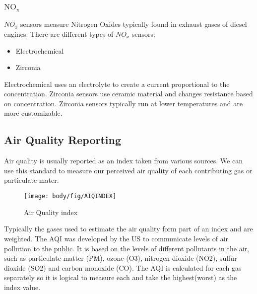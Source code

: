 \subsubsection{$\mathrm{NO_x}$}
${NO_x}$ sensors measure Nitrogen Oxides typically found in exhaust gases of diesel engines\cite{autolintec:noxsensor}. There are different types of ${NO_x}$ sensors\cite{drivearchive:noxsensor}:
\begin{itemize}
	\item Electrochemical
	\item Zirconia
\end{itemize}
Electrochemical uses an electrolyte to create a current proportional to the concentration.
Zirconia sensors use ceramic material and changes resistance based on concentration.
Zirconia sensors typically run at lower temperatures and are more customizable.\cite{miura2006electrochemical}


\subsection{Air Quality Reporting}
Air quality is usually reported as an index taken from various sources. We can use this standard to measure our perceived air quality of each contributing gas or particulate mater. \cite{airqualit:index} 

\begin{figure}[!htb]
	\centering
	\texttt{[image: body/fig/AIQINDEX]}
	\caption{Air Quality index \cite{GreenEcon2}}
	\label{fig:index}
\end{figure}

\noindent
Typically the gases used to estimate the air quality form part of an index and are weighted. The AQI was developed by the US to communicate levels of air pollution to the public\cite{Airly}.  It is based on the levels of different pollutants in the air, such as particulate matter (PM), ozone (O3), nitrogen dioxide (NO2), sulfur dioxide (SO2) and carbon monoxide (CO). The AQI is calculated for each gas separately so it is logical to measure each and take the highest(worst) as the index value.\cite{worldairqualityranking}


